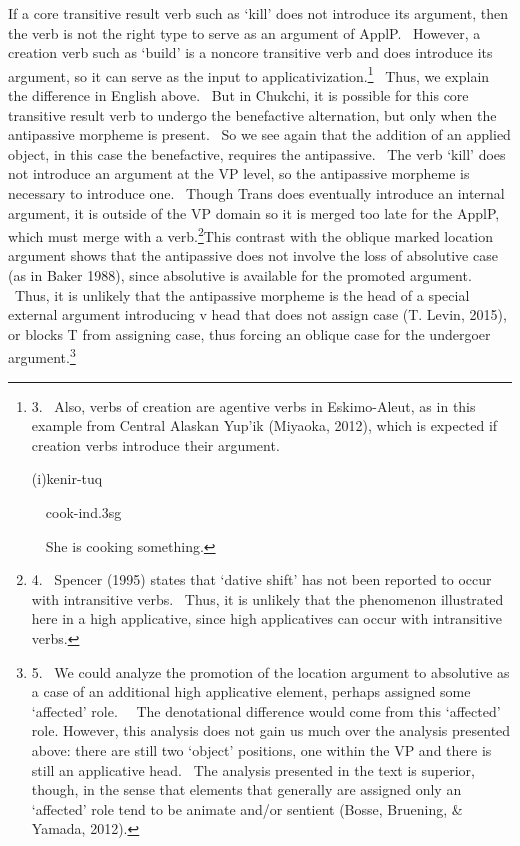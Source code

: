 \documentclass[12pt]{article}
\newenvironment{styleStandard}{\setlength\leftskip{0cm}\setlength\rightskip{0cm plus 1fil}\setlength\parindent{0cm}\setlength\parfillskip{0pt plus 1fil}\setlength\parskip{0in plus 1pt}\writerlistparindent\writerlistleftskip\leavevmode\normalfont\normalsize\writerlistlabel\ignorespaces}{\unskip\vspace{0.111in plus 0.0111in}\par}
\newcommand\writerlistleftskip{}
\newcommand\writerlistparindent{}
\newcommand\writerlistlabel{}
\begin{document}
\begin{styleStandard}
If a core transitive result verb such as ‘kill’ does not introduce its argument, then the verb is not the right type to serve as an argument of ApplP. \ However, a creation verb such as ‘build’ is a noncore transitive verb and does introduce its argument, so it can serve as the input to applicativization.\footnote{3. \ Also, verbs of creation are agentive verbs in Eskimo-Aleut, as in this example from Central Alaskan Yup’ik (Miyaoka, 2012), which is expected if creation verbs introduce their argument.\par (i)kenir-tuq\ \ \ \ \par \ \ cook-\textrm{ind}.3\textrm{sg}\par \textrm{\ \ }She is cooking something.} \ Thus, we explain the difference in English above. \ But in Chukchi, it is possible for this core transitive result verb to undergo the benefactive alternation, but only when the antipassive morpheme is present. \ So we see again that the addition of an applied object, in this case the benefactive, requires the antipassive. \ The verb ‘kill’ does not introduce an argument at the VP level, so the antipassive morpheme is necessary to introduce one. \ Though Trans does eventually introduce an internal argument, it is outside of the VP domain so it is merged too late for the ApplP, which must merge with a verb.\footnote{4. \ Spencer (1995) states that ‘dative shift’ has not been reported to occur with intransitive verbs. \ Thus, it is unlikely that the phenomenon illustrated here in a high applicative, since high applicatives can occur with intransitive verbs.}This contrast with the oblique marked location argument shows that the antipassive does not involve the loss of absolutive case (as in Baker 1988), since absolutive is available for the promoted argument. \ Thus, it is unlikely that the antipassive morpheme is the head of a special external argument introducing v head that does not assign case (T. Levin, 2015), or blocks T from assigning case, thus forcing an oblique case for the undergoer argument.\footnote{5. \ We could analyze the promotion of the location argument to absolutive as a case of an additional high applicative element, perhaps assigned some ‘affected’ role. \ \ The denotational difference would come from this ‘affected’ role. However, this analysis does not gain us much over the analysis presented above: there are still two ‘object’ positions, one within the VP and there is still an applicative head. \ The analysis presented in the text is superior, though, in the sense that elements that generally are assigned only an ‘affected’ role tend to be animate and/or sentient (Bosse, Bruening, \& Yamada, 2012).} 
\end{styleStandard}
\end{document}

